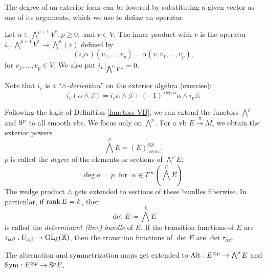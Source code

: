 The degree of an exterior form can be lowered by substituting a given vector as one of its arguments, which we use to define an operator.

\begin{defn}
    Let $\alpha\in\bigwedge^{p+1}V^\ast, p\geq 0,$ and $v\in V$. The inner product with $v$ is the operator $i_v:\bigwedge^{p+1}V^\ast\to \bigwedge^p(v)$ defined by 
    \[(i_v \alpha)(v_1,\ldots,v_p)=\alpha(v,v_1,\ldots,v_p),\]
    for $v_1,\ldots,v_p\in V$. We also put $\restr{i_v}{\bigwedge^0V^\ast}=0$.
\end{defn}

Note that $i_v$ is a ``\emph{$\wedge$-derivation}'' on the exterior algebra (exercise):
\[i_v(\alpha\wedge\beta)=i_v\alpha\wedge\beta+(-1)^{\deg \alpha}\alpha\wedge i_v\beta.\label{eq inner product derivation}\]

\begin{defn}
Following the logic of Definition \ref{functors VB}, we can extend the functors $\bigwedge^p$ and $\mathrm{S}^p$ to all smooth \glspl{vb}. We focus only on $\bigwedge^p$. For a \gls{vb} $E\overset{\pi}{\to} M$, we obtain the exterior powers
\[\bigwedge^p E=(E)^{\otimes p}_{\text{asym.}}.\]
$p$ is called the \emph{degree} of the elements or sections of $\bigwedge^p E$: \[\deg \alpha=p\;\text{ for }\;\alpha\in\Gamma^\infty\left(\bigwedge^p E\right).\]
The wedge product $\wedge$ gets extended to sections of these bundles fiberwise.
In particular, if $\operatorname{rank} E=k$, then \[\det E\coloneqq \bigwedge^k E\] is called the \emph{determinant (line) bundle} of $E$. If the transition functions of $E$ are $\tau_{\alpha\beta}:U_{\alpha\beta}\to \operatorname{GL}_k(\mathbb{R} )$, then the transition functions of $\det E$ are $\det \tau_{\alpha\beta}$.

The alternation and symmetrization maps get extended to $\operatorname{Alt}: E^{\otimes p}\to \bigwedge^p E$ and $\operatorname{Sym}: E^{\otimes p}\to \mathrm{S}^p E$.
\end{defn}

